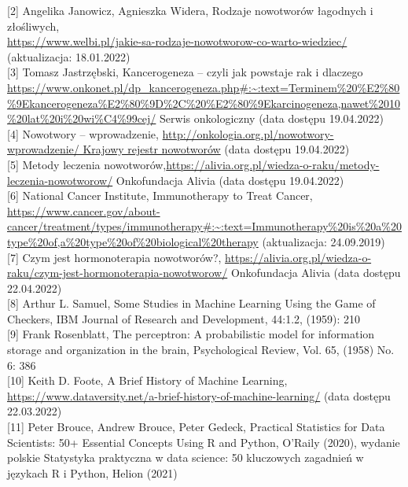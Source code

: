 \documentclass[a4paper,12pt,oneside]{book}
\begin{document}
[2] Angelika Janowicz,  Agnieszka Widera, Rodzaje nowotworów łagodnych i złośliwych,\\ \url{https://www.welbi.pl/jakie-sa-rodzaje-nowotworow-co-warto-wiedziec/} (aktualizacja: 18.01.2022)\\

[3] Tomasz Jastrzębski, Kancerogeneza – czyli jak powstaje rak i dlaczego\\ \url{https://www.onkonet.pl/dp_kancerogeneza.php#:~:text=Terminem\%20\%E2\%80\%9Ekancerogeneza\%E2\%80\%9D\%2C\%20\%E2\%80\%9Ekarcinogeneza,nawet\%2010\%20lat\%20i\%20wi\%C4\%99cej/}  Serwis onkologiczny (data dostępu 19.04.2022)\\

[4] Nowotwory – wprowadzenie,  \url{http://onkologia.org.pl/nowotwory-wprowadzenie/ Krajowy rejestr nowotworów} (data dostępu 19.04.2022)\\

[5] Metody leczenia nowotworów,\url{https://alivia.org.pl/wiedza-o-raku/metody-leczenia-nowotworow/} Onkofundacja Alivia (data dostępu 19.04.2022)\\

[6] National Cancer Institute, Immunotherapy to Treat Cancer,
\url{https://www.cancer.gov/about-cancer/treatment/types/immunotherapy#:~:text=Immunotherapy\%20is\%20a\%20type\%20of,a\%20type\%20of\%20biological\%20therapy} (aktualizacja: 24.09.2019)\\

[7] Czym jest hormonoterapia nowotworów?, \url{https://alivia.org.pl/wiedza-o-raku/czym-jest-hormonoterapia-nowotworow/}  Onkofundacja Alivia (data dostępu 22.04.2022)\\

[8] Arthur L. Samuel, Some Studies in Machine Learning Using the Game of Checkers, IBM Journal of Research and Development, 44:1.2, (1959): 210\\

[9] Frank Rosenblatt, The perceptron: A probabilistic model for information storage and organization in the brain, Psychological Review, Vol. 65, (1958) No. 6: 386\\

[10] Keith D. Foote, A Brief History of Machine Learning, \url{https://www.dataversity.net/a-brief-history-of-machine-learning/} (data dostępu 22.03.2022)\\

[11] Peter Brouce, Andrew Brouce, Peter Gedeck, Practical Statistics for Data Scientists: 50+ Essential Concepts Using R and Python, O’Raily (2020), wydanie polskie Statystyka praktyczna w data science: 50 kluczowych zagadnień w językach R i Python, Helion (2021)\\
\end{document}
